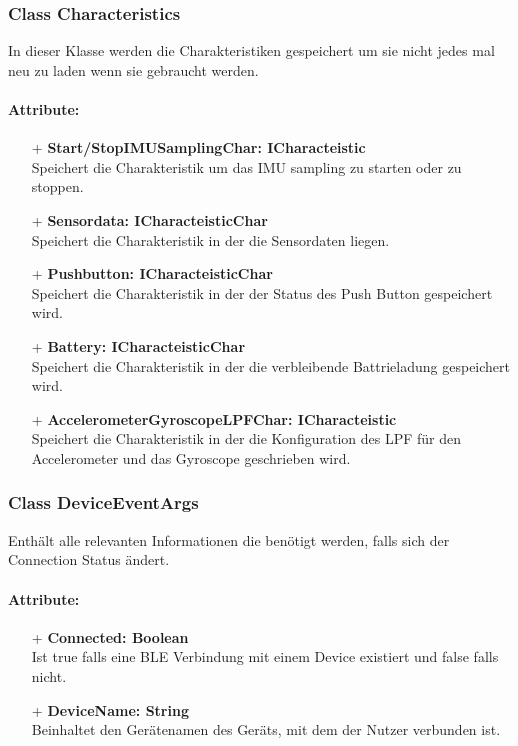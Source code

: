 \documentclass[a4paper,12pt]{article}
\begin{document}
\subsubsection{Class Characteristics}
In dieser Klasse werden die Charakteristiken gespeichert um sie nicht jedes mal neu zu laden wenn sie gebraucht werden.

\paragraph{Attribute:}
\begin{itemize}
	\item[+] \textbf{Start/StopIMUSamplingChar: ICharacteistic}\\Speichert die Charakteristik um das IMU sampling zu starten oder zu stoppen.
	\item[+] \textbf{Sensordata: ICharacteisticChar}\\Speichert die Charakteristik in der die Sensordaten liegen.
	\item[+] \textbf{Pushbutton: ICharacteisticChar}\\Speichert die Charakteristik in der der Status des Push Button gespeichert wird.
	\item[+] \textbf{Battery: ICharacteisticChar}\\Speichert die Charakteristik in der die verbleibende Battrieladung gespeichert wird.
	\item[+] \textbf{AccelerometerGyroscopeLPFChar: ICharacteistic}\\Speichert die Charakteristik in der die Konfiguration des LPF für den Accelerometer und das Gyroscope geschrieben wird.
\end{itemize}


\subsubsection{Class DeviceEventArgs}
Enthält alle relevanten Informationen die benötigt werden, falls sich der Connection Status ändert.

\paragraph{Attribute:}
\begin{itemize}
	\item[+] \textbf{Connected: Boolean}\\Ist true falls eine BLE Verbindung mit einem Device existiert und false falls nicht.
	\item[+] \textbf{DeviceName: String}\\Beinhaltet den Gerätenamen des Geräts, mit dem der Nutzer verbunden ist. 
\end{itemize}
\end{document}
